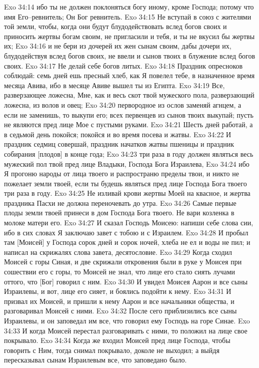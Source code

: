 Exo 34:14  ибо ты не должен поклоняться богу иному, кроме Господа; потому что имя Его--ревнитель; Он Бог ревнитель.
Exo 34:15  Не вступай в союз с жителями той земли, чтобы, когда они будут блудодействовать вслед богов своих и приносить жертвы богам своим, не пригласили и тебя, и ты не вкусил бы жертвы их;
Exo 34:16  и не бери из дочерей их жен сынам своим, дабы дочери их, блудодействуя вслед богов своих, не ввели и сынов твоих в блужение вслед богов своих.
Exo 34:17  Не делай себе богов литых.
Exo 34:18  Праздник опресноков соблюдай: семь дней ешь пресный хлеб, как Я повелел тебе, в назначенное время месяца Авива, ибо в месяце Авиве вышел ты из Египта.
Exo 34:19  Все, разверзающее ложесна, Мне, как и весь скот твой мужеского пола, разверзающий ложесна, из волов и овец;
Exo 34:20  первородное из ослов заменяй агнцем, а если не заменишь, то выкупи его; всех первенцев из сынов твоих выкупай; пусть не являются пред лице Мое с пустыми руками.
Exo 34:21  Шесть дней работай, а в седьмой день покойся; покойся и во время посева и жатвы.
Exo 34:22  И праздник седмиц совершай, праздник начатков жатвы пшеницы и праздник собирания [плодов] в конце года;
Exo 34:23  три раза в году должен являться весь мужеский пол твой пред лице Владыки, Господа Бога Израилева,
Exo 34:24  ибо Я прогоню народы от лица твоего и распространю пределы твои, и никто не пожелает земли твоей, если ты будешь являться пред лице Господа Бога твоего три раза в году.
Exo 34:25  Не изливай крови жертвы Моей на квасное, и жертва праздника Пасхи не должна переночевать до утра.
Exo 34:26  Самые первые плоды земли твоей принеси в дом Господа Бога твоего. Не вари козленка в молоке матери его.
Exo 34:27  И сказал Господь Моисею: напиши себе слова сии, ибо в сих словах Я заключаю завет с тобою и с Израилем.
Exo 34:28  И пробыл там [Моисей] у Господа сорок дней и сорок ночей, хлеба не ел и воды не пил; и написал на скрижалях слова завета, десятословие.
Exo 34:29  Когда сходил Моисей с горы Синая, и две скрижали откровения были в руке у Моисея при сошествии его с горы, то Моисей не знал, что лице его стало сиять лучами оттого, что [Бог] говорил с ним.
Exo 34:30  И увидел Моисея Аарон и все сыны Израилевы, и вот, лице его сияет, и боялись подойти к нему.
Exo 34:31  И призвал их Моисей, и пришли к нему Аарон и все начальники общества, и разговаривал Моисей с ними.
Exo 34:32  После сего приблизились все сыны Израилевы, и он заповедал им все, что говорил ему Господь на горе Синае.
Exo 34:33  И когда Моисей перестал разговаривать с ними, то положил на лице свое покрывало.
Exo 34:34  Когда же входил Моисей пред лице Господа, чтобы говорить с Ним, тогда снимал покрывало, доколе не выходил; а выйдя пересказывал сынам Израилевым все, что заповедано было.
